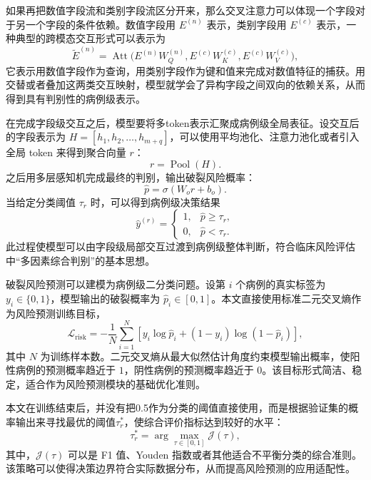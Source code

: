 如果再把数值字段流和类别字段流区分开来，那么交叉注意力可以体现一个字段对于另一个字段的条件依赖。数值字段用 $E^{(n)}$ 表示，类别字段用 $E^{(c)}$ 表示，一种典型的跨模态交互形式可以表示为
\begin{equation}
\widetilde{E}^{(n)} = \operatorname{Att}\bigl(E^{(n)}W_Q^{(n)},E^{(c)}W_K^{(c)},E^{(c)}W_V^{(c)}\bigr),
\label{eq:cross-modal-attention}
\end{equation}
它表示用数值字段作为查询，用类别字段作为键和值来完成对数值特征的捕获。用交替或者叠加这两类交互映射，模型就学会了异构字段之间双向的依赖关系，从而得到具有判别性的病例级表示。

在完成字段级交互之后，模型要将多token表示汇聚成病例级全局表征。设交互后的字段表示为 $H=[h_1,h_2,\ldots,h_{m+q}]$，可以使用平均池化、注意力池化或者引入全局 token 来得到聚合向量 $r$：
\begin{equation}
r = \operatorname{Pool}(H).
\label{eq:global-pooling}
\end{equation}
之后用多层感知机完成最终的判别，输出破裂风险概率：
\begin{equation}
\hat{p}=\sigma(W_o r + b_o).
\label{eq:risk-output}
\end{equation}
当给定分类阈值 $\tau_r$ 时，可以得到病例级决策结果
\begin{equation}
\hat{y}^{(r)}=
\begin{cases}
1, & \hat{p}\geq \tau_r,\\
0, & \hat{p}<\tau_r.
\end{cases}
\label{eq:risk-decision}
\end{equation}
此过程使模型可以由字段级局部交互过渡到病例级整体判断，符合临床风险评估中“多因素综合判别”的基本思想。

破裂风险预测可以建模为病例级二分类问题。设第 $i$ 个病例的真实标签为 $y_i\in\{0,1\}$，模型输出的破裂概率为 $\hat{p}_i\in[0,1]$。本文直接使用标准二元交叉熵作为风险预测训练目标，
\begin{equation}
\mathcal{L}_{\mathrm{risk}} = -\frac{1}{N}\sum_{i=1}^{N}\left[y_i\log \hat{p}_i + (1-y_i)\log(1-\hat{p}_i)\right],
\end{equation}
其中 $N$ 为训练样本数。二元交叉熵从最大似然估计角度约束模型输出概率，使阳性病例的预测概率趋近于 $1$，阴性病例的预测概率趋近于 $0$。该目标形式简洁、稳定，适合作为风险预测模块的基础优化准则。

本文在训练结束后，并没有把0.5作为分类的阈值直接使用，而是根据验证集的概率输出来寻找最优的阈值$\tau_r^{\ast}$，使综合评价指标达到较好的水平：
\begin{equation}
\tau_r^{\ast}=\arg\max_{\tau\in[0,1]}\mathcal{J}(\tau),
\label{eq:optimal-threshold}
\end{equation}
其中，$\mathcal{J}(\tau)$ 可以是 F1 值、Youden 指数或者其他适合不平衡分类的综合准则。该策略可以使得决策边界符合实际数据分布，从而提高风险预测的应用适配性。

